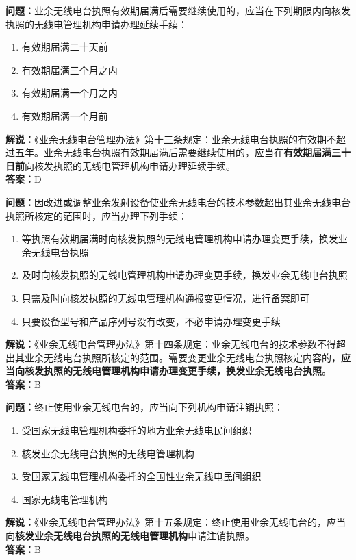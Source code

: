 \documentclass{ctexbook}
\begin{document}
\bigskip


\noindent\textbf{问题：}业余无线电台执照有效期届满后需要继续使用的，应当在下列期限内向核发执照的无线电管理机构申请办理延续手续：
\begin{enumerate}[label=\Alph*), leftmargin=3em]
	\item 有效期届满二十天前
	\item 有效期届满三个月之内
	\item 有效期届满一个月之内
	\item 有效期届满一个月前
\end{enumerate}
\noindent\textbf{解说：}《业余无线电台管理办法》第十三条规定：业余无线电台执照的有效期不超过五年。业余无线电台执照有效期届满后需要继续使用的，应当在\textbf{有效期届满三十日前}向核发执照的无线电管理机构申请办理延续手续。\\\noindent\textbf{答案：}D



\bigskip


\noindent\textbf{问题：}因改进或调整业余发射设备使业余无线电台的技术参数超出其业余无线电台执照所核定的范围时，应当办理下列手续：
\begin{enumerate}[label=\Alph*), leftmargin=3em]
	\item 等执照有效期届满时向核发执照的无线电管理机构申请办理变更手续，换发业余无线电台执照
	\item 及时向核发执照的无线电管理机构申请办理变更手续，换发业余无线电台执照
	\item 只需及时向核发执照的无线电管理机构通报变更情况，进行备案即可
	\item 只要设备型号和产品序列号没有改变，不必申请办理变更手续
\end{enumerate}
\noindent\textbf{解说：}《业余无线电台管理办法》第十四条规定：业余无线电台的技术参数不得超出其业余无线电台执照所核定的范围。需要变更业余无线电台执照核定内容的，\textbf{应当向核发执照的无线电管理机构申请办理变更手续，换发业余无线电台执照}。\\\noindent\textbf{答案：}B



\bigskip


\noindent\textbf{问题：}终止使用业余无线电台的，应当向下列机构申请注销执照：
\begin{enumerate}[label=\Alph*), leftmargin=3em]
	\item 受国家无线电管理机构委托的地方业余无线电民间组织
	\item 核发业余无线电台执照的无线电管理机构
	\item 受国家无线电管理机构委托的全国性业余无线电民间组织
	\item 国家无线电管理机构
\end{enumerate}
\noindent\textbf{解说：}《业余无线电台管理办法》第十五条规定：终止使用业余无线电台的，应当向\textbf{核发业余无线电台执照的无线电管理机构}申请注销执照。\\\noindent\textbf{答案：}B
\end{document}
